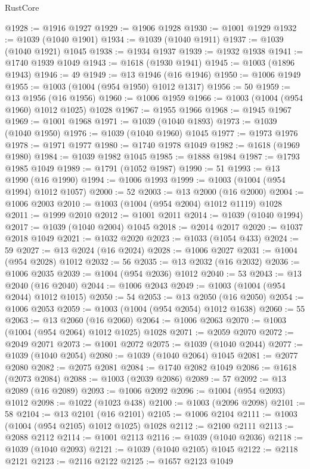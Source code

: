\begin{lexlean}{RustCore}
\begin{coremodule}
@1928 := @1916 @1927
@1929 := @1906 @1928
@1930 := @1001 @1929
@1932 := @1039 (@1040 @1901)
@1934 := @1039 (@1040 @1911)
@1937 := @1039 (@1040 @1921) @1045
@1938 := @1934 @1937
@1939 := @1932 @1938
@1941 := @1740 @1939 @1049
@1943 := @1618 (@1930 @1941)
@1945 := @1003 (@1896 @1943)
@1946 := 49
@1949 := @13 @1946 (@16 @1946)
@1950 := @1006 @1949
@1955 := @1003 (@1004 (@954 @1950) @1012 @1317)
@1956 := 50
@1959 := @13 @1956 (@16 @1956)
@1960 := @1006 @1959
@1966 := @1003 (@1004 (@954 @1960) @1012 @1025) @1028
@1967 := @1955 @1966
@1968 := @1945 @1967
@1969 := @1001 @1968
@1971 := @1039 (@1040 @1893)
@1973 := @1039 (@1040 @1950)
@1976 := @1039 (@1040 @1960) @1045
@1977 := @1973 @1976
@1978 := @1971 @1977
@1980 := @1740 @1978 @1049
@1982 := @1618 (@1969 @1980)
@1984 := @1039 @1982 @1045
@1985 := @1888 @1984
@1987 := @1793 @1985 @1049
@1989 := @1791 (@1052 @1987)
@1990 := 51
@1993 := @13 @1990 (@16 @1990)
@1994 := @1006 @1993
@1999 := @1003 (@1004 (@954 @1994) @1012 @1057)
@2000 := 52
@2003 := @13 @2000 (@16 @2000)
@2004 := @1006 @2003
@2010 := @1003 (@1004 (@954 @2004) @1012 @1119) @1028
@2011 := @1999 @2010
@2012 := @1001 @2011
@2014 := @1039 (@1040 @1994)
@2017 := @1039 (@1040 @2004) @1045
@2018 := @2014 @2017
@2020 := @1037 @2018 @1049
@2021 := @1032 @2020
@2023 := @1033 (@1054 @433)
@2024 := 59
@2027 := @13 @2024 (@16 @2024)
@2028 := @1006 @2027
@2031 := @1004 (@954 @2028) @1012
@2032 := 56
@2035 := @13 @2032 (@16 @2032)
@2036 := @1006 @2035
@2039 := @1004 (@954 @2036) @1012
@2040 := 53
@2043 := @13 @2040 (@16 @2040)
@2044 := @1006 @2043
@2049 := @1003 (@1004 (@954 @2044) @1012 @1015)
@2050 := 54
@2053 := @13 @2050 (@16 @2050)
@2054 := @1006 @2053
@2059 := @1003 (@1004 (@954 @2054) @1012 @1638)
@2060 := 55
@2063 := @13 @2060 (@16 @2060)
@2064 := @1006 @2063
@2070 := @1003 (@1004 (@954 @2064) @1012 @1025) @1028
@2071 := @2059 @2070
@2072 := @2049 @2071
@2073 := @1001 @2072
@2075 := @1039 (@1040 @2044)
@2077 := @1039 (@1040 @2054)
@2080 := @1039 (@1040 @2064) @1045
@2081 := @2077 @2080
@2082 := @2075 @2081
@2084 := @1740 @2082 @1049
@2086 := @1618 (@2073 @2084)
@2088 := @1003 (@2039 @2086)
@2089 := 57
@2092 := @13 @2089 (@16 @2089)
@2093 := @1006 @2092
@2096 := @1004 (@954 @2093) @1012
@2098 := @1022 (@1023 @438)
@2100 := @1003 (@2096 @2098)
@2101 := 58
@2104 := @13 @2101 (@16 @2101)
@2105 := @1006 @2104
@2111 := @1003 (@1004 (@954 @2105) @1012 @1025) @1028
@2112 := @2100 @2111
@2113 := @2088 @2112
@2114 := @1001 @2113
@2116 := @1039 (@1040 @2036)
@2118 := @1039 (@1040 @2093)
@2121 := @1039 (@1040 @2105) @1045
@2122 := @2118 @2121
@2123 := @2116 @2122
@2125 := @1657 @2123 @1049

\end{coremodule}
\end{lexlean}
